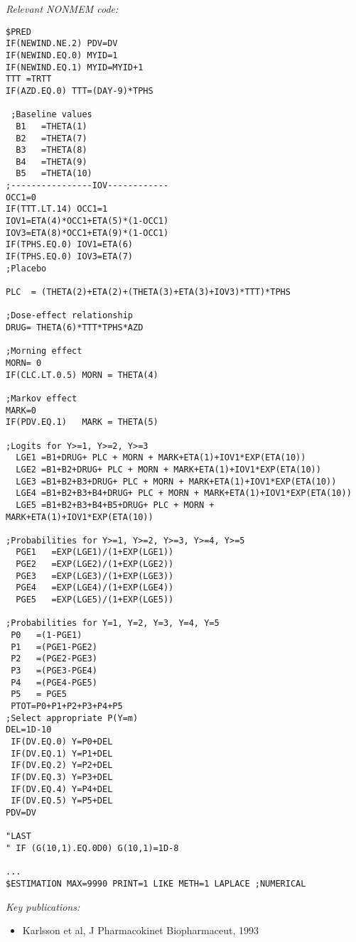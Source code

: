 \documentclass[a4paper,11pt]{article}
\begin{document}
\vspace{10pt}

\noindent \emph{Relevant NONMEM code:}
\begin{lstlisting}
$PRED
IF(NEWIND.NE.2) PDV=DV
IF(NEWIND.EQ.0) MYID=1
IF(NEWIND.EQ.1) MYID=MYID+1
TTT =TRTT
IF(AZD.EQ.0) TTT=(DAY-9)*TPHS

 ;Baseline values
  B1   =THETA(1)
  B2   =THETA(7)
  B3   =THETA(8)
  B4   =THETA(9)
  B5   =THETA(10)
;----------------IOV------------
OCC1=0
IF(TTT.LT.14) OCC1=1
IOV1=ETA(4)*OCC1+ETA(5)*(1-OCC1)
IOV3=ETA(8)*OCC1+ETA(9)*(1-OCC1)
IF(TPHS.EQ.0) IOV1=ETA(6)
IF(TPHS.EQ.0) IOV3=ETA(7)
;Placebo

PLC  = (THETA(2)+ETA(2)+(THETA(3)+ETA(3)+IOV3)*TTT)*TPHS

;Dose-effect relationship
DRUG= THETA(6)*TTT*TPHS*AZD

;Morning effect
MORN= 0
IF(CLC.LT.0.5) MORN = THETA(4)

;Markov effect
MARK=0
IF(PDV.EQ.1)   MARK = THETA(5)

;Logits for Y>=1, Y>=2, Y>=3
  LGE1 =B1+DRUG+ PLC + MORN + MARK+ETA(1)+IOV1*EXP(ETA(10))
  LGE2 =B1+B2+DRUG+ PLC + MORN + MARK+ETA(1)+IOV1*EXP(ETA(10))
  LGE3 =B1+B2+B3+DRUG+ PLC + MORN + MARK+ETA(1)+IOV1*EXP(ETA(10))
  LGE4 =B1+B2+B3+B4+DRUG+ PLC + MORN + MARK+ETA(1)+IOV1*EXP(ETA(10))
  LGE5 =B1+B2+B3+B4+B5+DRUG+ PLC + MORN + MARK+ETA(1)+IOV1*EXP(ETA(10))

;Probabilities for Y>=1, Y>=2, Y>=3, Y>=4, Y>=5
  PGE1   =EXP(LGE1)/(1+EXP(LGE1))
  PGE2   =EXP(LGE2)/(1+EXP(LGE2))
  PGE3   =EXP(LGE3)/(1+EXP(LGE3))
  PGE4   =EXP(LGE4)/(1+EXP(LGE4))
  PGE5   =EXP(LGE5)/(1+EXP(LGE5))

;Probabilities for Y=1, Y=2, Y=3, Y=4, Y=5
 P0   =(1-PGE1)
 P1   =(PGE1-PGE2)
 P2   =(PGE2-PGE3)
 P3   =(PGE3-PGE4)
 P4   =(PGE4-PGE5)
 P5   = PGE5
 PTOT=P0+P1+P2+P3+P4+P5
;Select appropriate P(Y=m)
DEL=1D-10
 IF(DV.EQ.0) Y=P0+DEL
 IF(DV.EQ.1) Y=P1+DEL
 IF(DV.EQ.2) Y=P2+DEL
 IF(DV.EQ.3) Y=P3+DEL
 IF(DV.EQ.4) Y=P4+DEL
 IF(DV.EQ.5) Y=P5+DEL
PDV=DV

"LAST
" IF (G(10,1).EQ.0D0) G(10,1)=1D-8

...
$ESTIMATION MAX=9990 PRINT=1 LIKE METH=1 LAPLACE ;NUMERICAL
\end{lstlisting}

\noindent \emph{Key publications:}
\begin{itemize}
\item Karlsson et al, J Pharmacokinet Biopharmaceut, 1993
\end{itemize}
\end{document}
